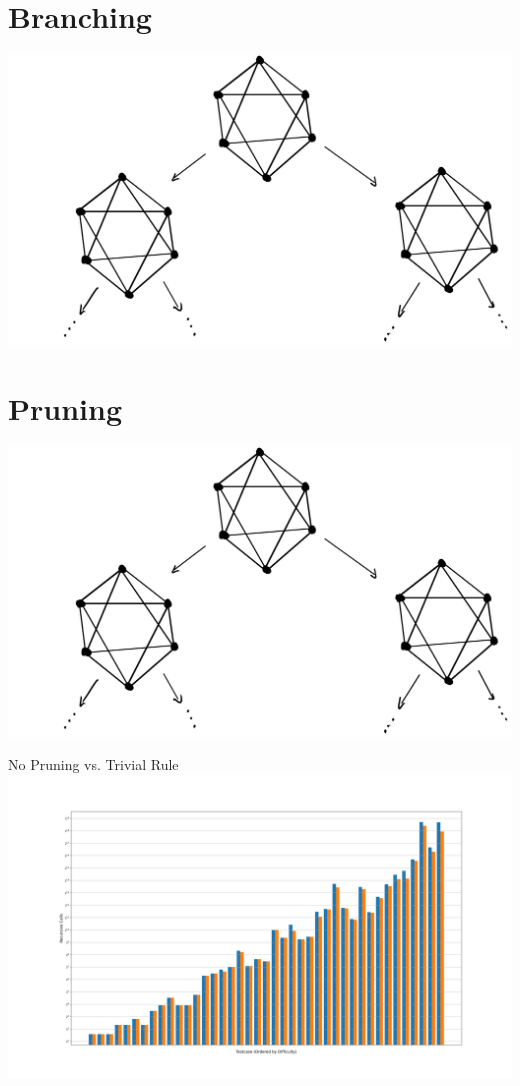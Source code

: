 \documentclass[12pt]{article}
\begin{document}
\newpage
\section*{Branching}

    \begin{center} \includegraphics[scale=.75]{fig16.png} \end{center}

\newpage
\section*{Pruning}
    
    \begin{center} \includegraphics[scale=.75]{fig16.png} \end{center}

\newpage
\begin{center} No Pruning vs. Trivial Rule\\\includegraphics[scale=.5]{nonetrivial.png} \end{center}
\end{document}
